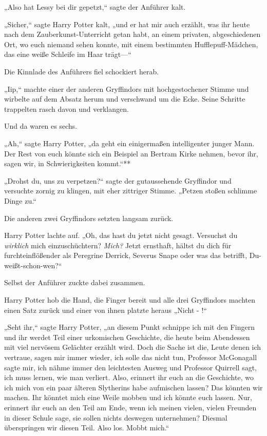 {„Also hat Lessy bei dir gepetzt,“ sagte der Anführer kalt.

„Sicher,“ sagte Harry Potter kalt, „und er hat mir auch erzählt, was ihr heute nach dem Zauberkunst-Unterricht getan habt, an einem privaten, abgeschiedenen Ort, wo euch niemand sehen konnte, mit einem bestimmten Hufflepuff-Mädchen, das eine weiße Schleife im Haar trägt—“

Die Kinnlade des Anführers fiel schockiert herab.

„Iip,“ machte einer der anderen Gryffindors mit hochgestochener Stimme und wirbelte auf dem Absatz herum und verschwand um die Ecke. Seine Schritte trappelten rasch davon und verklangen.

Und da waren es sechs.

„Ah,“ sagte Harry Potter, „da geht ein einigermaßen intelligenter junger Mann. Der Rest von euch könnte sich ein Beispiel an Bertram Kirke nehmen, bevor ihr, sagen wir, in Schwierigkeiten kommt.“**

„Drohst du, uns zu verpetzen?“ sagte der gutaussehende Gryffindor und versuchte zornig zu klingen, mit eher zittriger Stimme. „Petzen stoßen schlimme Dinge zu.“

Die anderen zwei Gryffindors setzten langsam zurück.

Harry Potter lachte auf. „Oh, das hast du jetzt nicht gesagt. Versuchst du \emph{wirklich} mich einzuschüchtern? \emph{Mich?} Jetzt ernsthaft, hältst du dich für furchteinflößender als Peregrine Derrick, Severus Snape oder was das betrifft, Du-weißt-schon-wen?“

Selbst der Anführer zuckte dabei zusammen.

Harry Potter hob die Hand, die Finger bereit und alle drei Gryffindors machten einen Satz zurück und einer von ihnen platzte heraus „Nicht - !“

„Seht ihr,“ sagte Harry Potter, „an diesem Punkt schnippe ich mit den Fingern und ihr werdet Teil einer urkomischen Geschichte, die heute beim Abendessen mit viel nervösem Gelächter erzählt wird. Doch die Sache ist die, Leute denen ich vertraue, sagen mir immer wieder, ich solle das nicht tun, Professor McGonagall sagte mir, ich nähme immer den leichtesten Ausweg und Professor Quirrell sagt, ich muss lernen, wie man verliert. Also, erinnert ihr euch an die Geschichte, wo ich mich von ein paar älteren Slytherins habe aufmischen lassen? Das könnten wir machen. Ihr könntet mich eine Weile mobben und ich könnte euch lassen. Nur, erinnert ihr euch an den Teil am Ende, wenn ich meinen vielen, vielen Freunden in dieser Schule sage, sie sollen nichts deswegen unternehmen? Diesmal überspringen wir diesen Teil. Also los. Mobbt mich.“

}
